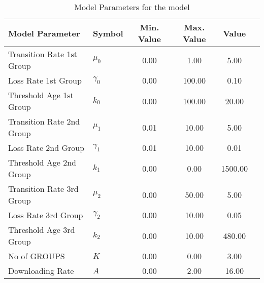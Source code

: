 \begin{table}
\centering
\begin{tabular}{p{5cm}lcccc}
{\bf Model Parameter} & {\bf Symbol} & {\bf Min. Value} & {\bf Max. Value} & {\bf Value}\\
\hline\hline
Transition Rate 1st Group & $\mu_0$ & 0.00 & 1.00 & 5.00\\
Loss Rate 1st Group & $\gamma_0$ & 0.00 & 100.00 & 0.10\\
Threshold Age 1st Group & $k_0$ & 0.00 & 100.00 & 20.00\\
Transition Rate 2nd Group & $\mu_1$ & 0.01 & 10.00 & 5.00\\
Loss Rate 2nd Group & $\gamma_1$ & 0.01 & 10.00 & 0.01\\
Threshold Age 2nd Group & $k_1$ & 0.00 & 0.00 & 1500.00\\
Transition Rate 3rd Group & $\mu_2$ & 0.00 & 50.00 & 5.00\\
Loss Rate 3rd Group & $\gamma_2$ & 0.00 & 10.00 & 0.05\\
Threshold Age 3rd Group & $k_2$ & 0.00 & 10.00 & 480.00\\
No of GROUPS & $K$ & 0.00 & 0.00 & 3.00\\
Downloading Rate & $A$ & 0.00 & 2.00 & 16.00\\
\hline\hline
\end{tabular}
\caption{Model Parameters for the model}
\end{table}
